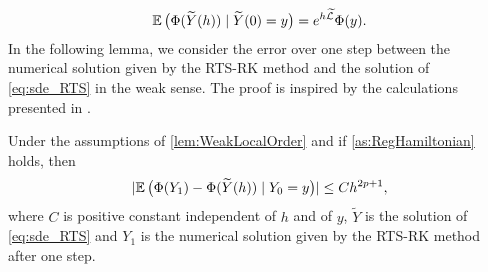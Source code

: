 \documentclass[10pt]{article}
\begin{document}
\begin{equation}
	\operatorname{\mathbb{E}} \big(\Phi(\widetilde Y(h))\mid \widetilde Y(0) = y\big) = e^{h\widetilde {\mathcal{L}}}\Phi(y).
\end{equation}
In the following lemma, we consider the error over one step between the numerical solution given by the RTS-RK method and the solution of \eqref{eq:sde_RTS} in the weak sense. The proof is inspired by the calculations presented in \cite[Section 2.4]{CGS17}.
\begin{lemma}\label{lem:WeakSDELocal} Under the assumptions of \cref{lem:WeakLocalOrder} and if \cref{as:RegHamiltonian} holds, then
	\begin{equation}
		\lvert\operatorname{\mathbb{E}}\big(\Phi(Y_1)- \Phi(\widetilde Y(h))\mid Y_0 = y\big)\rvert \leq C h^{2p+1},
	\end{equation}
	where $C$ is  positive constant independent of $h$ and of $y$, $\tilde Y$ is the solution of \eqref{eq:sde_RTS} and $Y_1$ is the numerical solution given by the RTS-RK method after one step.
\end{lemma}
\end{document}
